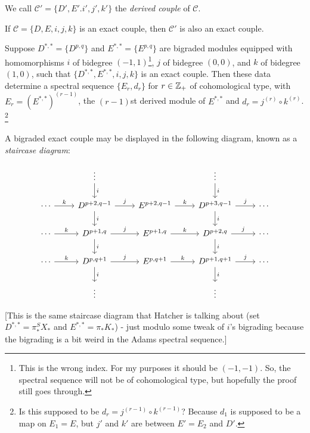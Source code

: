 \documentclass{MetricNotes2023}
\def\inte{\ensuremath\mathbb{Z}}
\begin{document}
We call \(\mathcal{C}'=\{D', E'. i', j', k'\}\) the \textit{derived couple} of \(\mathcal{C}\). 

\begin{proposition}
If \(\mathcal{C}=\{D, E, i, j, k\}\) is an exact couple, then \(\mathcal{C}'\) is also an exact couple.
\end{proposition}

\begin{theorem}\label{2503301131}
Suppose \(D^{*,*}=\{D^{p,q}\}\) and \(E^{*,*}=\{E^{p,q}\}\) are bigraded modules equipped with homomorphisms \(i\) of bidegree \((-1,1)\)\footnote{This is the wrong index. For my purposes it should be \((-1, -1)\). So, the spectral sequence will not be of cohomological type, but hopefully the proof still goes through.}, \(j\) of bidegree \((0,0)\), and \(k\) of bidegree \((1,0)\), such that \(\{D^{*,*}, E^{*,*}, i, j, k\}\) is an exact couple. Then these data determine a spectral sequence \(\{E_r, d_r\}\) for \(r\in \inte_+\) of cohomological type, with \(E_r=(E^{*,*})^{(r-1)}\), the \((r-1)\)st derived module of \(E^{*,*}\) and \(d_r=j^{(r)}\circ k^{(r)}\). \footnote{Is this supposed to be \(d_r = j^{(r-1)}\circ k^{(r-1)}\)? Because \(d_1\) is supposed to be a map on \(E_1=E\), but \(j'\) and \(k'\) are between \(E'=E_2\) and \(D'\).}
\end{theorem}

A bigraded exact couple may be displayed in the following diagram, known as a \textit{staircase diagram}:

\[\begin{tikzcd} 
   &  \vdots \arrow[d, "i"] &  & \vdots \arrow[d, "i"] & \\
 \cdots \arrow[r, "k"] & D^{p+2, q-1} \arrow[d, "i"] \arrow[r, "j"] & E^{p+2,q-1}  \arrow[r, "k"] & D^{p+3,q-1} \arrow[d, "i"] \arrow[r, "j"] & \cdots \\
 \cdots \arrow[r, "k"] & D^{p+1,q} \arrow[d, "i"] \arrow[r, "j"] & E^{p+1,q}  \arrow[r, "k"] & D^{p+2,q} \arrow[d, "i"] \arrow[r, "j"] & \cdots \\
 \cdots \arrow[r, "k"] & D^{p,q+1}  \arrow[d, "i"] \arrow[r, "j"] & E^{p,q+1}  \arrow[r, "k"] & D^{p+1,q+1} \arrow[d, "i"] \arrow[r, "j"] & \cdots \\
 & \vdots &  & \vdots & 
\end{tikzcd}\]

[This is the same staircase diagram that Hatcher is talking about (set \(D^{*,*}=\pi_*^SX_*\) and \(E^{*,*}=\pi_*K_*\)) - just modulo some tweak of \(i\)'s bigrading because the bigrading is a bit weird in the Adams spectral sequence.]
\end{document}
